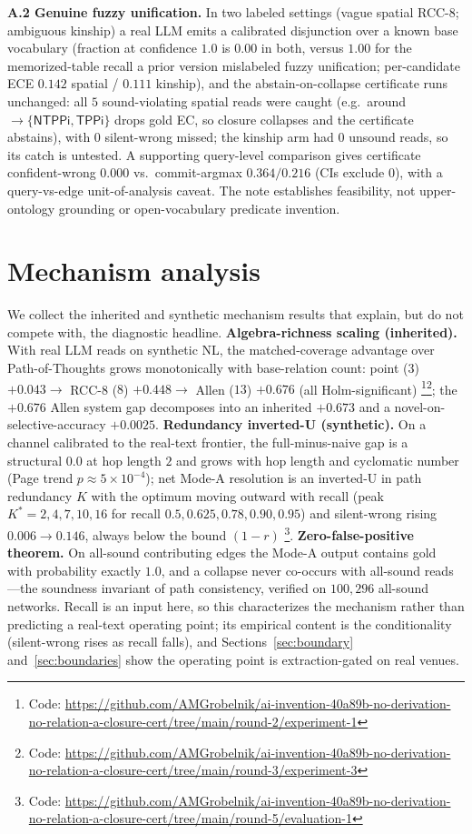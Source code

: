 \documentclass[11pt,letterpaper]{article}
\begin{document}
\textbf{A.2 Genuine fuzzy unification.} In two labeled settings (vague spatial RCC-8; ambiguous kinship) a real LLM emits a calibrated disjunction over a known base vocabulary (fraction at confidence $1.0$ is $0.00$ in both, versus $1.00$ for the memorized-table recall a prior version mislabeled fuzzy unification; per-candidate ECE $0.142$ spatial / $0.111$ kinship), and the abstain-on-collapse certificate runs unchanged: all $5$ sound-violating spatial reads were caught (e.g.\ \textsf{around}$\rightarrow\{\textsf{NTPPi},\textsf{TPPi}\}$ drops gold \textsf{EC}, so closure collapses and the certificate abstains), with $0$ silent-wrong missed; the kinship arm had $0$ unsound reads, so its catch is untested. A supporting query-level comparison gives certificate confident-wrong $0.000$ vs.\ commit-argmax $0.364/0.216$ (CIs exclude $0$), with a query-vs-edge unit-of-analysis caveat. The note establishes feasibility, not upper-ontology grounding or open-vocabulary predicate invention.

\section{Mechanism analysis}
\label{sec:mechanism}

We collect the inherited and synthetic mechanism results that explain, but do not compete with, the diagnostic headline. \textbf{Algebra-richness scaling (inherited).} With real LLM reads on synthetic NL, the matched-coverage advantage over Path-of-Thoughts grows monotonically with base-relation count: point ($3$) $+0.043 \rightarrow$ RCC-8 ($8$) $+0.448 \rightarrow$ Allen ($13$) $+0.676$ (all Holm-significant) \footnote{Code: \url{https://github.com/AMGrobelnik/ai-invention-40a89b-no-derivation-no-relation-a-closure-cert/tree/main/round-2/experiment-1}}\footnote{Code: \url{https://github.com/AMGrobelnik/ai-invention-40a89b-no-derivation-no-relation-a-closure-cert/tree/main/round-3/experiment-3}}; the $+0.676$ Allen system gap decomposes into an inherited $+0.673$ and a novel-on-selective-accuracy $+0.0025$. \textbf{Redundancy inverted-U (synthetic).} On a channel calibrated to the real-text frontier, the full-minus-naive gap is a structural $0.0$ at hop length $2$ and grows with hop length and cyclomatic number (Page trend $p\approx 5\times 10^{-4}$); net Mode-A resolution is an inverted-U in path redundancy $K$ with the optimum moving outward with recall (peak $K^\ast = 2,4,7,10,16$ for recall $0.5,0.625,0.78,0.90,0.95$) and silent-wrong rising $0.006\rightarrow0.146$, always below the bound $(1-r)$ \footnote{Code: \url{https://github.com/AMGrobelnik/ai-invention-40a89b-no-derivation-no-relation-a-closure-cert/tree/main/round-5/evaluation-1}}. \textbf{Zero-false-positive theorem.} On all-sound contributing edges the Mode-A output contains gold with probability exactly $1.0$, and a collapse never co-occurs with all-sound reads---the soundness invariant of path consistency, verified on $100{,}296$ all-sound networks. Recall is an input here, so this characterizes the mechanism rather than predicting a real-text operating point; its empirical content is the conditionality (silent-wrong rises as recall falls), and Sections~\ref{sec:boundary} and~\ref{sec:boundaries} show the operating point is extraction-gated on real venues.



\end{document}
